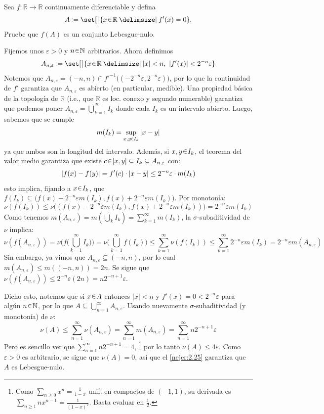\setcounter{neje}{28}
\begin{nejer}
Sea $f \colon \mathbb{R} \to \mathbb{R}$ continuamente diferenciable y defina
$$
A \coloneq \set[\big]{x \en \mathbb{R} \given f'(x) = 0}.
$$
Pruebe que $f(A)$ es un conjunto Lebesgue-nulo.
\end{nejer}
\begin{sol}
Fijemos unos $\varepsilon>0$ y $n\en\mathbb{N}$ arbitrarios. Ahora definimos
\[
A_{n,\varepsilon} \coloneq \set[\big]{x \en \mathbb{R} \given |x| < n,\ |f'(x)| < 2^{-n}\varepsilon}
\]
Notemos que $A_{n,\varepsilon} = (-n,n) \cap f'^{-1}\bigl((-2^{-n}\varepsilon,2^{-n}\varepsilon)\bigr)$, por lo que la continuidad de $f'$ garantiza que $A_{n,\varepsilon}$ es abierto (en particular, medible). Una propiedad básica de la topología de $\mathbb{R}$ (i.e., que $\mathbb{R}$ es loc. conexo y segundo numerable) garantiza que podemos poner $A_{n,\varepsilon} = \dot\bigcup^\infty_{k=1} I_k$ donde cada $I_k$ es un intervalo abierto. Luego, sabemos que se cumple
\[
m(I_k) = \sup_{x,y\en I_k} \abs{x-y}
\]
ya que ambos son la longitud del intervalo. Además, si $x,y \en I_k$, el teorema del valor medio garantiza que existe $c\en [x,y] \subseteq I_k \subseteq A_{n,\varepsilon}$ con:
\[
\abs{f(x) - f(y)} = f'(c)\cdot\abs{x-y} \leq 2^{-n}\varepsilon\cdot m(I_k)
\]
esto implica, fijando a $x\en I_k$, que $f(I_k) \subseteq \bigl(f(x)-2^{-n}\varepsilon m(I_k), f(x) +2^{-n}\varepsilon m(I_k)\bigr)$. Por monotonía:
\[
\nu(f(I_k)) \leq \nu\bigl((f(x)-2^{-n}\varepsilon m(I_k), f(x) +2^{-n}\varepsilon m(I_k))\bigr) = 2^{-n}\varepsilon m(I_k)
\]
Como tenemos $m(A_{n,\varepsilon}) = m(\dot\bigcup_kI_k) =\sum^\infty_{k=1} m(I_k)$, la $\sigma$-subaditividad de $\nu$ implica:
\[
\nu(f(A_{n,\varepsilon}))
= \nu\biggl(f\biggl(\bigcup^\infty_{k=1}I_k\biggr)\biggr) 
= \nu\biggl(\bigcup^\infty_{k=1}f(I_k)\biggr)
\leq \sum^\infty_{k=1} \nu(f(I_k))
\leq \sum^\infty_{k=1} 2^{-n}\varepsilon m(I_k) = 2^{-n}\varepsilon m(A_{n,\varepsilon})
\]
Sin embargo, ya vimos que $A_{n,\varepsilon} \subseteq (-n,n)$, por lo cual $m(A_{n,\varepsilon}) \leq m((-n,n)) = 2n$. Se sigue que $\nu(f(A_{n,\varepsilon})) \leq 2^{-n}\varepsilon(2n) = n2^{-n+1}\varepsilon$.\par
Dicho esto, notemos que si $x\en A$ entonces $|x| < n$ y $f'(x) = 0 < 2^{-n}\varepsilon$ para algún $n\en\mathbb{N}$, por lo que $A \subseteq \bigcup^\infty_{n=1}A_{n,\varepsilon}$. Usando nuevamente $\sigma$-subaditividad (y monotonía) de $\nu$:
\[
\nu(A)
\leq \sum^\infty_{n=1} \nu(A_{n,\varepsilon})
= \sum^\infty_{n=1} m(A_{n,\varepsilon})
= \sum^\infty_{n=1} n2^{-n+1}\varepsilon
\]
Pero es sencillo ver que $\sum^\infty_{n=1} n2^{-n+1} = 4$,%
\footnote{
    Como $\sum_{n\ge0} x^n = \frac{1}{1-x}$ unif. en compactos de $(-1,1)$, su derivada es $\sum_{n\ge1} nx^{n-1} = \frac{1}{(1-x)^2}$. Basta evaluar en $\frac12$.
}
por lo tanto $\nu(A) \le 4\varepsilon$. Como $\varepsilon>0$ es arbitrario, se sigue que $\nu(A) = 0$, así que el \cref{nejer:2.25} garantiza que $A$ es Lebesgue-nulo.
\end{sol}